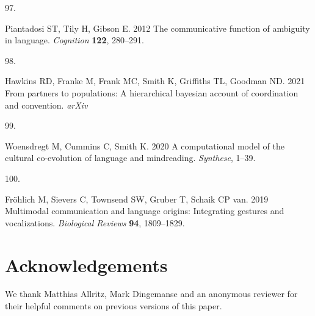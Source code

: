 \documentclass[
  man,floatsintext]{apa6}
\newlength{\cslhangindent}
\newlength{\csllabelwidth}
\newlength{\cslentryspacingunit} %
\newenvironment{CSLReferences}[2] %
 {%
  \setlength{\parindent}{0pt}
  \ifodd #1
  \let\oldpar\par
  \def\par{\hangindent=\cslhangindent\oldpar}
  \fi
  \setlength{\parskip}{#2\cslentryspacingunit}
 }%
 {}
\newcommand{\CSLLeftMargin}[1]{\parbox[t]{\csllabelwidth}{#1}}
\newcommand{\CSLRightInline}[1]{\parbox[t]{\linewidth - \csllabelwidth}{#1}\break}
\begin{document}
\begin{CSLReferences}{0}{0}
\leavevmode{}%
\CSLLeftMargin{97. }
\CSLRightInline{Piantadosi ST, Tily H, Gibson E. 2012 The communicative function of ambiguity in language. \emph{Cognition} \textbf{122}, 280--291.}

\leavevmode{}%
\CSLLeftMargin{98. }
\CSLRightInline{Hawkins RD, Franke M, Frank MC, Smith K, Griffiths TL, Goodman ND. 2021 From partners to populations: A hierarchical bayesian account of coordination and convention. \emph{arXiv} }

\leavevmode{}%
\CSLLeftMargin{99. }
\CSLRightInline{Woensdregt M, Cummins C, Smith K. 2020 A computational model of the cultural co-evolution of language and mindreading. \emph{Synthese}, 1--39.}

\leavevmode{}%
\CSLLeftMargin{100. }
\CSLRightInline{Fröhlich M, Sievers C, Townsend SW, Gruber T, Schaik CP van. 2019 Multimodal communication and language origins: Integrating gestures and vocalizations. \emph{Biological Reviews} \textbf{94}, 1809--1829.}

\end{CSLReferences}

\endgroup

\hypertarget{acknowledgements}{%
\section{Acknowledgements}\label{acknowledgements}}

We thank Matthias Allritz, Mark Dingemanse and an anonymous reviewer for their helpful comments on previous versions of this paper.
\end{document}
